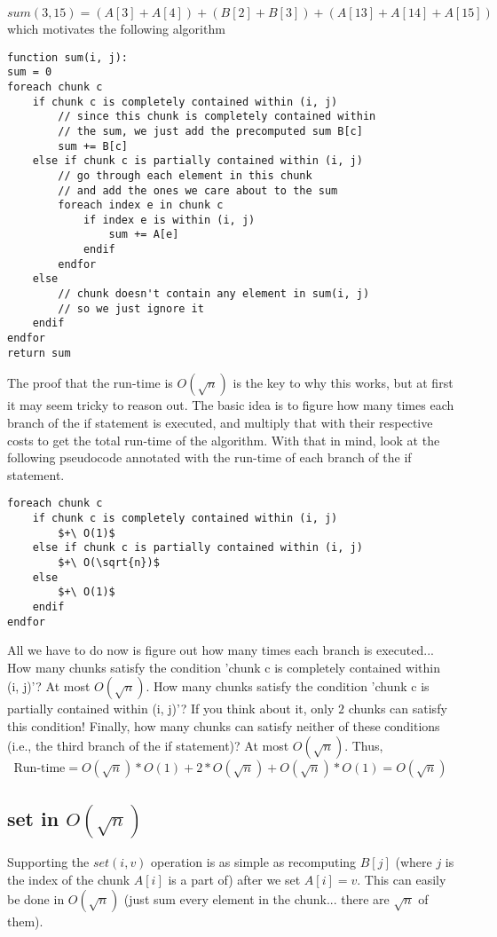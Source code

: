 \documentclass[11pt]{article}
\theoremstyle{plain}
\theoremstyle{definition}
\begin{document}
$$\boxed{sum(3, 15) = (A[3] + A[4]) + (B[2] + B[3] ) + (A[13] + A[14] + A[15])}$$
which motivates the following algorithm
\begin{lstlisting}
function sum(i, j):
sum = 0
foreach chunk c 
	if chunk c is completely contained within (i, j)
		// since this chunk is completely contained within
		// the sum, we just add the precomputed sum B[c]
		sum += B[c]
	else if chunk c is partially contained within (i, j)
		// go through each element in this chunk
		// and add the ones we care about to the sum
		foreach index e in chunk c
			if index e is within (i, j)
				sum += A[e]
			endif
		endfor
	else 
		// chunk doesn't contain any element in sum(i, j)
		// so we just ignore it
	endif
endfor
return sum
\end{lstlisting}

\noindent The proof that the run-time is $O(\sqrt{n})$ is the key to why this works, but at first it may seem tricky to reason out. The basic idea is to figure how many times each branch of the if statement is executed, and multiply that with their respective costs to get the total run-time of the algorithm. With that in mind, look at the following pseudocode annotated with the run-time of each branch of the if statement.

\begin{lstlisting}[mathescape=true]
foreach chunk c 
	if chunk c is completely contained within (i, j)
		$+\ O(1)$
	else if chunk c is partially contained within (i, j)
		$+\ O(\sqrt{n})$
	else 
		$+\ O(1)$
	endif
endfor
\end{lstlisting}
All we have to do now is figure out how many times each branch is executed... How many chunks satisfy the condition 'chunk c is completely contained within (i, j)'? At most $O(\sqrt{n})$. How many chunks satisfy the condition 'chunk c is partially contained within (i, j)'? If you think about it, only $2$ chunks can satisfy this condition! Finally, how many chunks can satisfy neither of these conditions (i.e., the third branch of the if statement)? At most $O(\sqrt{n})$. Thus,
$$\boxed{\text{Run-time} = O(\sqrt{n}) * O(1) + 2*O(\sqrt{n}) + O(\sqrt{n})*O(1) = O(\sqrt{n})}$$
\subsection{set in $O(\sqrt{n})$}
Supporting the $set(i, v)$ operation is as simple as recomputing $B[j]$ (where $j$ is the index of the chunk $A[i]$ is a part of) after we set $A[i] = v$. This can easily be done in $O(\sqrt{n})$ (just sum every element in the chunk... there are $\sqrt{n}$ of them).
\end{document}
